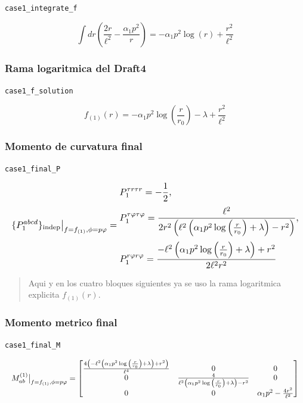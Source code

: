 \documentclass[11pt,a4paper]{article}
\begin{document}
\noindent\texttt{case1\_integrate\_f}\par\nopagebreak[4]

\[
\int dr\left(\frac{2r}{\ell^2}-\frac{\alpha_1p^2}{r}\right) = - \alpha_{1} p^{2} \log{\left(r \right)} + \frac{r^{2}}{\ell^{2}}
\]

\subsubsection{Rama logaritmica del Draft4}

\noindent\texttt{case1\_f\_solution}\par\nopagebreak[4]

\[
f_{(1)}(r) = - \alpha_{1} p^{2} \log{\left(\frac{r}{r_{0}} \right)} - \lambda + \frac{r^{2}}{\ell^{2}}
\]

\subsubsection{Momento de curvatura final}

\noindent\texttt{case1\_final\_P}\par\nopagebreak[4]

\[
\resizebox{\textwidth}{!}{$\displaystyle \{P_1^{abcd}\}_{\mathrm{indep}}\big|_{f=f_{(1)},\phi=p\varphi} = \begin{aligned}&P_1^{{\tau}{r}{\tau}{r}}=- \frac{1}{2},\\[2pt]&P_1^{{\tau}{\varphi}{\tau}{\varphi}}=\frac{\ell^{2}}{2 r^{2} \left(\ell^{2} \left(\alpha_{1} p^{2} \log{\left(\frac{r}{r_{0}} \right)} + \lambda\right) - r^{2}\right)},\\[2pt]&P_1^{{r}{\varphi}{r}{\varphi}}=\frac{- \ell^{2} \left(\alpha_{1} p^{2} \log{\left(\frac{r}{r_{0}} \right)} + \lambda\right) + r^{2}}{2 \ell^{2} r^{2}}\end{aligned}$}
\]

\begin{quote}\small Aqui y en los cuatro bloques siguientes ya se uso la rama logaritmica explicita \(f_{(1)}(r)\).\end{quote}

\subsubsection{Momento metrico final}

\noindent\texttt{case1\_final\_M}\par\nopagebreak[4]

\[
\resizebox{\textwidth}{!}{$\displaystyle M^{(1)}_{ab}\big|_{f=f_{(1)},\phi=p\varphi} = \left[\begin{matrix}\frac{4 \left(- \ell^{2} \left(\alpha_{1} p^{2} \log{\left(\frac{r}{r_{0}} \right)} + \lambda\right) + r^{2}\right)}{\ell^{4}} & 0 & 0\\0 & \frac{4}{\ell^{2} \left(\alpha_{1} p^{2} \log{\left(\frac{r}{r_{0}} \right)} + \lambda\right) - r^{2}} & 0\\0 & 0 & \alpha_{1} p^{2} - \frac{4 r^{2}}{\ell^{2}}\end{matrix}\right]$}
\]
\end{document}
